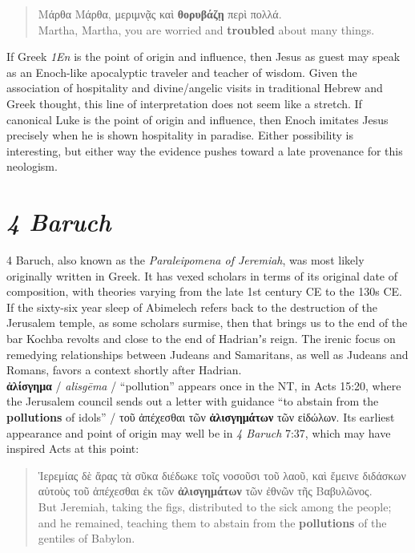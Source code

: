  \begin{quote}Μάρθα Μάρθα, μεριμνᾷς καὶ \textbf{θορυβάζῃ} περὶ πολλά. \\[1mm] %
 Martha, Martha, you are worried and \textbf{troubled} about many things.\end{quote} %
 \vspace*{2mm} 

\noindent{}If Greek \textit{1En} is the point of origin and influence, %
then Jesus as guest may speak as an Enoch-like apocalyptic traveler and teacher of wisdom. %
Given the association of hospitality and divine/angelic visits %
in traditional Hebrew and Greek thought, %
this line of interpretation does not seem like a stretch. %
If canonical Luke is the point of origin and influence, %
then Enoch imitates Jesus precisely when he is shown hospitality in paradise. %
Either possibility is interesting, %
but either way the evidence pushes toward a late provenance for this neologism. \\[1mm] %

\section{\textit{4 Baruch}}

\noindent{}4 Baruch, also known as the \textit{Paraleipomena of Jeremiah}, was most likely originally written in Greek. %
It has vexed scholars in terms of its original date of composition, with theories varying from the late 1st century CE to the 130s CE. %
If the sixty-six year sleep of Abimelech refers back to the destruction of the Jerusalem temple, %
as some scholars surmise, then that brings us to the end of the bar Kochba revolts and %
close to the end of Hadrianʼs reign. %
The irenic focus on remedying relationships between Judeans and Samaritans, as well as Judeans and Romans, favors a context shortly after Hadrian. \\[0.5mm] %

\noindent{}\textbf{ἀλίσγημα} / \textit{alisgēma} / “pollution” appears once in the NT, in Acts 15:20, %
where the Jerusalem council sends out a letter with guidance “to abstain from the \textbf{pollutions} of idols” / %
τοῦ ἀπέχεσθαι τῶν \textbf{ἀλισγημάτων} τῶν εἰδώλων. %
Its earliest appearance and point of origin may well be in \textit{4 Baruch} 7:37, %
which may have inspired Acts at this point: %

\vspace*{1.5mm}
 \begin{quote}Ἱερεμίας δὲ ἄρας τὰ σῦκα διέδωκε τοῖς νοσοῦσι τοῦ λαοῦ, %
 καὶ ἔμεινε διδάσκων αὐτοὺς τοῦ ἀπέχεσθαι ἐκ τῶν \textbf{ἀλισγημάτων} τῶν ἐθνῶν τῆς Βαβυλῶνος. \\[1mm] %
But Jeremiah, taking the figs, distributed to the sick among the people; %
 and he remained, teaching them to abstain from the \textbf{pollutions} of the gentiles of Babylon. \end{quote} %
 \vspace*{1.5mm}

